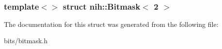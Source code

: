\subsubsection*{template$<$$>$ struct nih\-::\-Bitmask$<$ 2 $>$}



\-The documentation for this struct was generated from the following file\-:\begin{DoxyCompactItemize}
\item 
bits/bitmask.\-h\end{DoxyCompactItemize}
